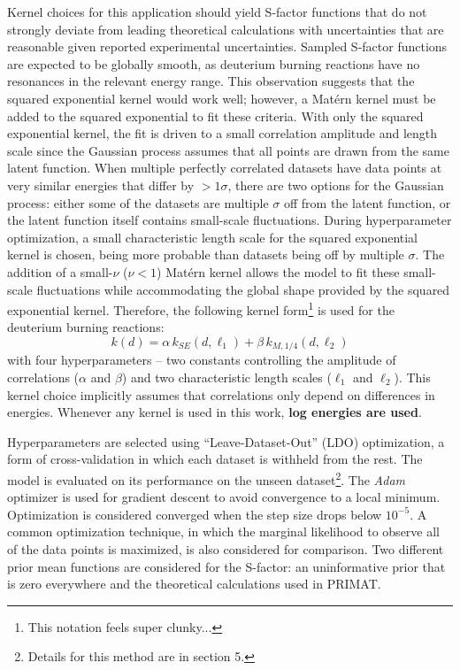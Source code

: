 \documentclass[%
 reprint,
superscriptaddress,
nofootinbib,
 amsmath,amssymb,
 aps,
 pra,
]{revtex4-2}
\begin{document}
Kernel choices for this application should yield S-factor functions that do not strongly deviate from leading theoretical calculations with uncertainties that are reasonable given reported experimental uncertainties. Sampled S-factor functions are expected to be globally smooth, as deuterium burning reactions have no resonances in the relevant energy range. This observation suggests that the squared exponential kernel would work well; however, a Mat\'ern kernel must be added to the squared exponential to fit these criteria. With only the squared exponential kernel, the fit is driven to a small correlation amplitude and length scale since the Gaussian process assumes that all points are drawn from the same latent function. When multiple perfectly correlated datasets have data points at very similar energies that differ by $>1\sigma$, there are two options for the Gaussian process: either some of the datasets are multiple $\sigma$ off from the latent function, or the latent function itself contains small-scale fluctuations. During hyperparameter optimization, a small characteristic length scale for the squared exponential kernel is chosen, being more probable than datasets being off by multiple $\sigma$. The addition of a small-$\nu$ ($\nu<1$) Mat\'ern kernel allows the model to fit these small-scale fluctuations while accommodating the global shape provided by the squared exponential kernel. Therefore, the following kernel form\footnote{This notation feels super clunky...} is used for the deuterium burning reactions: 
\begin{equation}
	k(d) = \alpha \, k_{SE}(d, \ell_1) + \beta \, k_{M, 1/4}(d, \ell_2) \nonumber
\end{equation}
with four hyperparameters -- two constants controlling the amplitude of correlations ($\alpha$ and $\beta$) and two characteristic length scales ($\ell_1$ and $\ell_2$). This kernel choice implicitly assumes that correlations only depend on differences in energies. Whenever any kernel is used in this work, \textbf{log energies are used}. 

Hyperparameters are selected using ``Leave-Dataset-Out'' (LDO) optimization, a form of cross-validation in which each dataset is withheld from the rest. The model is evaluated on its performance on the unseen dataset\footnote{Details for this method are in section 5.}. The \textit{Adam} optimizer \cite{Kingma2017} is used for gradient descent to avoid convergence to a local minimum. Optimization is considered converged when the step size drops below $10^{-5}$. A common optimization technique, in which the marginal likelihood to observe all of the data points is maximized, is also considered for comparison. Two different prior mean functions are considered for the S-factor: an uninformative prior that is zero everywhere and the theoretical calculations used in PRIMAT. 
\end{document}
